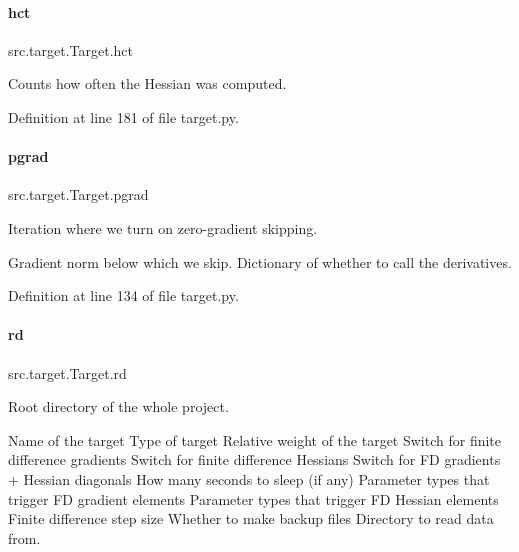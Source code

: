 \mbox{\label{classsrc_1_1target_1_1Target_a7964ee4d0c5d7c249b50aa97bcafc73e}} 
\paragraph{\texorpdfstring{hct}{hct}}
{\footnotesize\ttfamily src.\+target.\+Target.\+hct}



Counts how often the Hessian was computed. 



Definition at line 181 of file target.\+py.

\mbox{\label{classsrc_1_1target_1_1Target_a5eb45ee670449762fb6a9885db9889aa}} 
\paragraph{\texorpdfstring{pgrad}{pgrad}}
{\footnotesize\ttfamily src.\+target.\+Target.\+pgrad}



Iteration where we turn on zero-\/gradient skipping. 

Gradient norm below which we skip. Dictionary of whether to call the derivatives. 

Definition at line 134 of file target.\+py.

\mbox{\label{classsrc_1_1target_1_1Target_af85bc6ed8a95bc598f2e72a7213b972e}} 
\paragraph{\texorpdfstring{rd}{rd}}
{\footnotesize\ttfamily src.\+target.\+Target.\+rd}



Root directory of the whole project. 

Name of the target Type of target Relative weight of the target Switch for finite difference gradients Switch for finite difference Hessians Switch for FD gradients + Hessian diagonals How many seconds to sleep (if any) Parameter types that trigger FD gradient elements Parameter types that trigger FD Hessian elements Finite difference step size Whether to make backup files Directory to read data from. 

